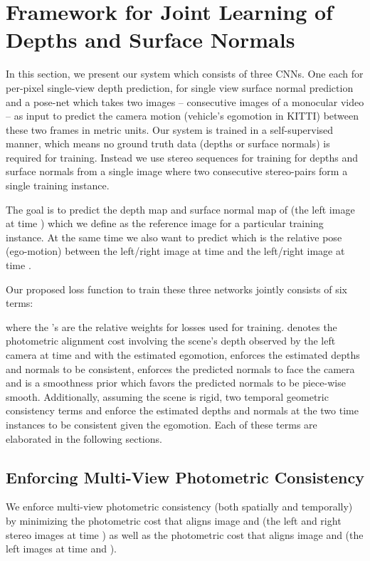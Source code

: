 \documentclass[letterpaper, 10 pt, conference]{ieeeconf}
\begin{document}
\section{Framework for Joint Learning of Depths and Surface Normals} \label{sec:depth_normal}
In this section, we present our system which consists of three CNNs. One each for per-pixel single-view depth prediction, for single view surface normal prediction and a pose-net which takes two images -- consecutive images of a monocular video -- as input to predict the camera motion (vehicle's egomotion in KITTI) between these two frames in metric units. Our system is trained in a self-supervised manner, which means no ground truth data (depths or surface normals) is required for training. Instead we use stereo sequences for training for depths and surface normals from a single image where two consecutive stereo-pairs  form a single training instance. 

The goal is to predict the depth map  and surface normal map  of  (the left image at time ) which we define as the reference image  for a particular training instance. At the same time we also want to predict  which is the relative pose (ego-motion) between the left/right image at time  and the left/right image at time .



Our proposed loss function to train these three networks jointly consists of six terms:

where the 's are the relative weights for losses used for training.
 denotes the photometric alignment cost involving the scene's depth observed by the left camera at time  and  with the estimated egomotion,  enforces the estimated depths and normals to be consistent,  enforces the predicted normals to face the camera and  is a smoothness prior which favors the predicted normals to be piece-wise smooth. Additionally, assuming the scene is rigid,  two temporal geometric consistency terms  and  enforce the estimated depths and normals at the two time instances to be consistent given the egomotion. Each of these terms are elaborated in the following sections. 



\subsection{Enforcing Multi-View Photometric Consistency} \label{sec:learn_depth}
We enforce multi-view photometric consistency (both spatially and temporally) by minimizing the photometric cost that aligns image  and  (the left and right stereo images at time ) as well as the photometric cost that aligns image  and  (the left images at time  and ).
\end{document}
